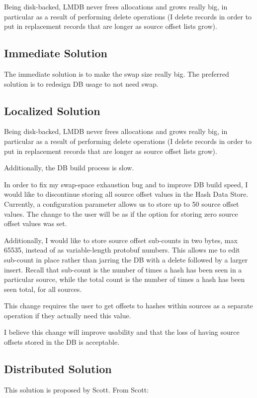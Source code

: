\documentclass[12pt,twoside]{article}
\begin{document}
Being disk-backed, LMDB never frees allocations and grows really big, in
particular as a result of performing delete operations (I delete records
in order to put in replacement records that are longer as source offset
lists grow).

\subsection{Immediate Solution}
The immediate solution is to make the swap size really big.
The preferred solution is to redesign DB usage to not need swap.

\subsection{Localized Solution}
Being disk-backed, LMDB never frees allocations and grows really big, in
particular as a result of performing delete operations (I delete records
in order to put in replacement records that are longer as source offset
lists grow).

Additionally, the DB build process is slow.

In order to fix my swap-space exhaustion bug and to improve DB build
speed, I would like to discontinue storing all source offset values in
the Hash Data Store.  Currently, a configuration parameter allows us to
store up to 50 source offset values.  The change to the user will be as
if the option for storing zero source offset values was set.

Additionally, I would like to store source offset sub-counts in two
bytes, max 65535, instead of as variable-length protobuf numbers.  This
allows me to edit sub-count in place rather than jarring the DB with a
delete followed by a larger insert.  Recall that sub-count is the number
of times a hash has been seen in a particular source, while the total
count is the number of times a hash has been seen total, for all sources.

This change requires the user to get offsets to hashes within sources as
a separate operation if they actually need this value.

I believe this change will improve usability and that the loss of having
source offsets stored in the DB is acceptable.

\subsection{Distributed Solution}
This solution is proposed by Scott. From Scott:\\
\end{document}
